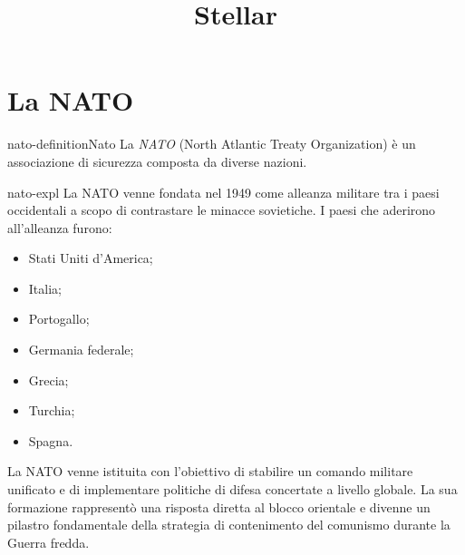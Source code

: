 \documentclass[preview]{standalone}
\begin{document}
\title{Stellar}
\genpage

\section{La NATO}

\begin{snippetdefinition}{nato-definition}{Nato}
    La \textit{NATO} (North Atlantic Treaty Organization) è un associazione di sicurezza composta da diverse nazioni.
\end{snippetdefinition}

\begin{snippet}{nato-expl}
    La NATO venne fondata nel 1949 come alleanza militare
    tra i paesi occidentali a scopo di contrastare le minacce sovietiche.
    I paesi che aderirono all'alleanza furono:
    \begin{itemize}
        \item Stati Uniti d'America;
        \item Italia;
        \item Portogallo;
        \item Germania federale;
        \item Grecia;
        \item Turchia;
        \item Spagna.
    \end{itemize}
    La NATO venne istituita con l'obiettivo di stabilire un comando militare unificato e di implementare politiche
    di difesa concertate a livello globale. La sua formazione rappresentò una risposta diretta al blocco orientale e
    divenne un pilastro fondamentale della strategia di contenimento del comunismo durante la Guerra fredda.
\end{snippet}
\end{document}
